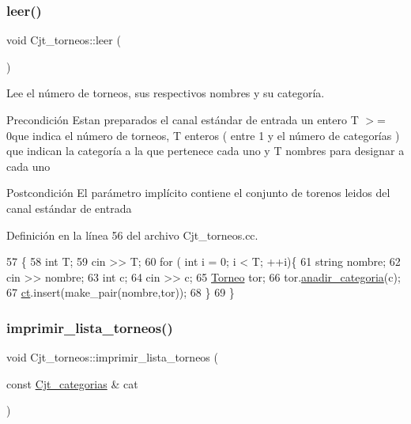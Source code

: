 \subsubsection{\texorpdfstring{leer()}{leer()}}
{\footnotesize\ttfamily void Cjt\+\_\+torneos\+::leer (\begin{DoxyParamCaption}{ }\end{DoxyParamCaption})}



Lee el número de torneos, sus respectivos nombres y su categoría. 

\begin{DoxyPrecond}{Precondición}
Estan preparados el canal estándar de entrada un entero T $>$= 0que indica el número de torneos, T enteros ( entre 1 y el número de categorías ) que indican la categoría a la que pertenece cada uno y T nombres para designar a cada uno 
\end{DoxyPrecond}
\begin{DoxyPostcond}{Postcondición}
El parámetro implícito contiene el conjunto de torenos leidos del canal estándar de entrada 
\end{DoxyPostcond}


Definición en la línea 56 del archivo Cjt\+\_\+torneos.\+cc.


\begin{DoxyCode}
57 \{
58     \textcolor{keywordtype}{int} T;
59     cin >> T;
60     \textcolor{keywordflow}{for} ( \textcolor{keywordtype}{int} i = 0; i < T; ++i)\{
61         \textcolor{keywordtype}{string} nombre;
62         cin >> nombre;
63         \textcolor{keywordtype}{int} c;
64         cin >> c;
65         \hyperlink{class_torneo}{Torneo} tor;
66         tor.\hyperlink{class_torneo_a089468654daf52979cd7c393c51ceb85}{anadir\_categoria}(c);
67         \hyperlink{class_cjt__torneos_a701df4fc4fbd2d6ffa081a01845083f3}{ct}.insert(make\_pair(nombre,tor));
68     \}
69 \}
\end{DoxyCode}
\mbox{\label{class_cjt__torneos_a29ca3cb4f9fd9f5924b07add78601f40}} 
\subsubsection{\texorpdfstring{imprimir\+\_\+lista\+\_\+torneos()}{imprimir\_lista\_torneos()}}
{\footnotesize\ttfamily void Cjt\+\_\+torneos\+::imprimir\+\_\+lista\+\_\+torneos (\begin{DoxyParamCaption}\item[{const \hyperlink{class_cjt__categorias}{Cjt\+\_\+categorias} \&}]{cat }\end{DoxyParamCaption})}



